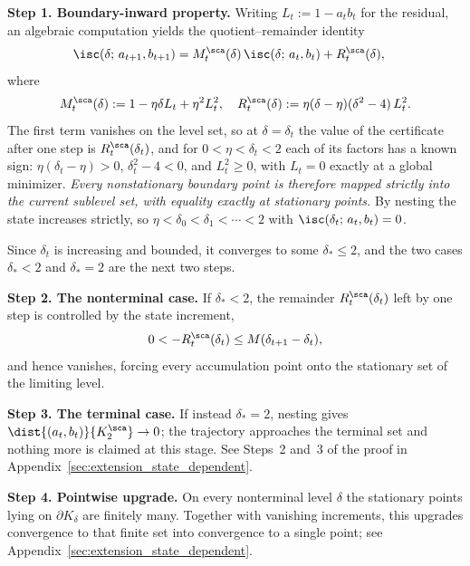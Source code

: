 \documentclass{article}
\begin{document}
\textbf{Step 1. Boundary-inward property.}
Writing $L_t := 1 - a_t b_t$ for the residual, an algebraic computation yields
the quotient--remainder identity
\begin{align}\label{eq:certificate_for_scalar}
    \isc(\delta;\, a_{t+1}, b_{t+1})
    &= M_t^\sca(\delta)\, \isc(\delta;\, a_t, b_t)
       + R_t^\sca(\delta),
\end{align}
where
\begin{align}
M_t^\sca(\delta) := 1 - \eta\delta L_t + \eta^2 L_t^2, \quad
R_t^\sca(\delta) := \eta(\delta - \eta)(\delta^2 - 4)\, L_t^2.
\label{eq:sc_M_t_R_t_def}
\end{align}
The first term vanishes on the level set, so at $\delta=\delta_t$ the value of
the certificate after one step is $R_t^\sca(\delta_t)$, and for
$0<\eta<\delta_t<2$ each of its factors has a known sign:
$\eta(\delta_t-\eta)>0$, $\delta_t^2-4<0$, and $L_t^2\ge0$, with $L_t=0$ exactly
at a global minimizer.
\emph{Every nonstationary boundary point is therefore mapped strictly into the
current sublevel set, with equality exactly at stationary points.}
By nesting the state increases strictly, so
$\eta<\delta_0<\delta_1<\cdots<2$ with $\isc(\delta_t;\,a_t,b_t)=0$.

Since $\delta_t$ is increasing and bounded, it converges to some
$\delta_\ast\le2$, and the two cases $\delta_\ast<2$ and $\delta_\ast=2$ are the
next two steps.

\textbf{Step 2. The nonterminal case.}
If $\delta_\ast<2$, the remainder $R_t^\sca(\delta_t)$ left by one step is
controlled by the state increment,
\begin{align}
    0<-R_t^\sca(\delta_t)\le M(\delta_{t+1}-\delta_t),
\end{align}
and hence vanishes, forcing every accumulation point onto the stationary set of
the limiting level.

\textbf{Step 3. The terminal case.}
If instead $\delta_\ast=2$, nesting gives $\dist{(a_t,b_t)}{K_2^\sca}\to0$; the
trajectory approaches the terminal set and nothing more is claimed at this
stage. See Steps~2 and~3 of the proof in
Appendix~\ref{sec:extension_state_dependent}.

\textbf{Step 4. Pointwise upgrade.}
On every nonterminal level $\delta$ the stationary points lying on
$\partial K_\delta$ are finitely many. Together with vanishing increments, this
upgrades convergence to that finite set into convergence to a single point; see Appendix~\ref{sec:extension_state_dependent}.
\end{document}
